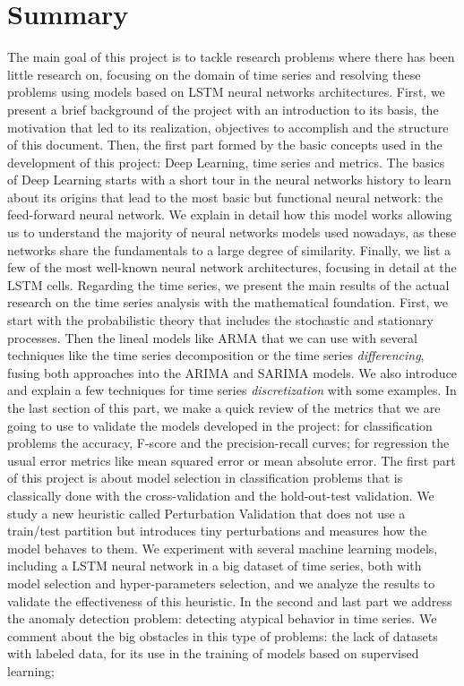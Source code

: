 %

\chapter*{Summary}\label{ch:summary}

The main goal of this project is to tackle research problems where there has been little research on, focusing on the domain of time series and resolving these problems using models based on LSTM neural networks architectures. First, we present a brief background of the project with an introduction to its basis, the motivation that led to its realization, objectives to accomplish and the structure of this document. Then, the first part formed by the basic concepts used in the development of this project: Deep Learning, time series and metrics. The basics of Deep Learning starts with a short tour in the neural networks  history to learn about its origins that lead to the most basic but functional neural network: the feed-forward neural network. We explain in detail how this model works allowing us to understand the majority of neural networks models used nowadays, as these networks share the fundamentals to a large degree of similarity. Finally, we list a few of the most well-known neural network architectures, focusing in detail at the LSTM cells. Regarding the time series, we present the main results of the actual research on the time series analysis with the mathematical foundation. First, we start with the probabilistic theory that includes the stochastic and stationary processes. Then the lineal models like ARMA that we can use with several techniques like the time series decomposition or the time series \emph{differencing}, fusing both approaches into the ARIMA and SARIMA models. We also introduce and explain a few techniques for time series \emph{discretization} with some examples. In the last section of this part, we make a quick review of the metrics that we are going to use to validate the models developed in the project: for classification problems the accuracy, F-score and the precision-recall curves; for regression the usual error metrics like mean squared error or mean absolute error. The first part of this project is about model selection in classification problems that is classically done with the cross-validation and the hold-out-test validation. We study a new heuristic called Perturbation Validation that does not use a train/test partition but introduces tiny perturbations and measures how the model behaves to them. We experiment with several machine learning models, including a LSTM neural network in a big dataset of time series, both with model selection and hyper-parameters selection, and we analyze the results to validate the effectiveness of this heuristic. In the second and last part we address the anomaly detection problem: detecting atypical behavior in time series. We comment about the big obstacles in this type of problems: the lack of datasets with labeled data, for its use in the training of models based on supervised learning; 